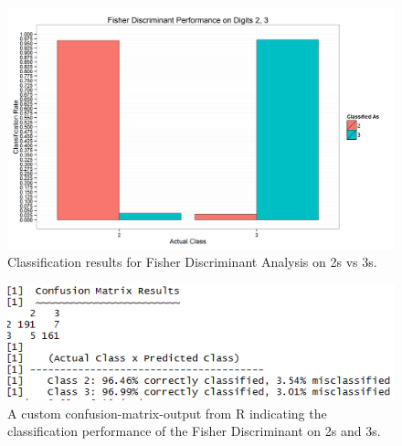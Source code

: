 \documentclass{article}
\begin{document}
\newpage
\begin{figure}[h!]
  \centering
  \includegraphics[width=.8\linewidth]{Fisher_Discriminant_Performance_on_Digits_2,_3}
  \caption{Classification results for Fisher Discriminant Analysis on 2s vs 3s.}
  \label{fig:2_3_bar}
\end{figure}
\begin{figure}[h!]
  \centering
  \includegraphics[width=.8\linewidth]{2_3_confusion}
  \caption{A custom confusion-matrix-output from R indicating the classification performance of the Fisher Discriminant on 2s and 3s.}
  \label{fig:2_3_confusion}
\end{figure}
%
\newpage
\end{document}
